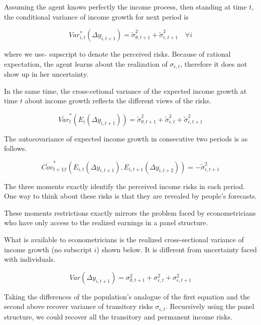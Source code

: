 \documentclass[12pt,notitlepage,onecolumn,aps,pra]{revtex4-1}
\begin{document}
Assuming the agent knows perfectly the income process, then standing at
time \(t\), the conditional variance of income growth for next period is

\begin{equation}
Var^*_{i,t}(\Delta y_{i,t+1}) = \tilde \sigma^2_{\theta,t+1} + \tilde \sigma^2_{\epsilon,t+1} \quad \forall i
\end{equation}

where we use \(\tilde{}\) supscript to denote the perceived risks.
Because of rational expectation, the agent learns about the realization
of \(\sigma_{\epsilon,t}\), therefore it does not show up in her
uncertainty.

In the same time, the cross-cetional variance of the expected income
growth at time \(t\) about income growth reflects the different views of
the risks.

\begin{equation}
\overline {Var}^*_{t}(E_{i}(\Delta y_{i,t+1})) = \tilde \sigma^2_{\theta,t+1} +\tilde \sigma^2_{\epsilon,t}+ \tilde \sigma^2_{\epsilon,t+1}
\end{equation}

The autocovariance of expected income growth in consecutive two periods
is as follows.

\begin{equation}
\overline {Cov}^*_{t+1|t}(E_{i,t}(\Delta y_{i,t+1}),E_{i,t+1}(\Delta y_{i,t+2}) ) = - \tilde \sigma^2_{\epsilon,t+1}
\end{equation}

The three moments exactly identify the perceived income risks in each
period. One way to think about these risks is that they are revealed by
people's forecasts.

These moments restrictions exactly mirrors the problem faced by
econometricians who have only access to the realized earnings in a panel
structure.

What is available to econometricians is the realized cross-sectional
variance of income growth (no subscript \(i\)) shown below. It is
different from uncertainty faced with individuals.

\begin{equation}
Var (\Delta y_{i,t+1}) =  \sigma^2_{\theta,t+1} +\sigma^2_{\epsilon,t}+ \sigma^2_{\epsilon,t+1}
\end{equation}

Taking the differences of the population's analogue of the first
equation and the second above recover variance of transitory risks
\(\sigma_{\epsilon,t}\). Recursively using the panel structure, we could
recover all the transitory and permanent income risks.
\end{document}
